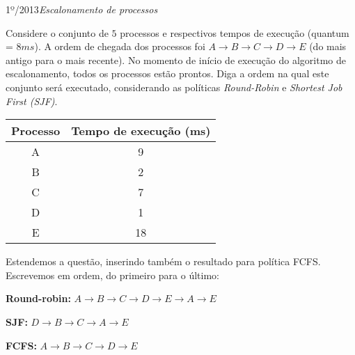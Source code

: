 \begin{exercicio}
  {1º/2013}{\textit{Escalonamento de processos}}
  {Considere o conjunto de $5$ processos e respectivos tempos de execução (quantum = $8 ms$). A ordem de chegada dos processos foi $A \rightarrow B \rightarrow C \rightarrow D \rightarrow E$ (do mais antigo para o mais recente). No momento de início de execução do algoritmo de escalonamento, todos os processos estão prontos. Diga a ordem na qual este conjunto será executado, considerando as políticas \textit{Round-Robin} e \textit{Shortest Job First (SJF)}.
  \begin{table}[!H]
    \centering
    \begin{tabular}{cc}
      \hline \hline
      \textbf{Processo} & \textbf{Tempo de execução (ms)} \\ \hline
      A                 & 9                               \\
      B                 & 2                              \\
      C                 & 7                               \\
      D                 & 1                               \\
      E                 & 18                              \\ \hline \hline
    \end{tabular}
  \end{table}
  } %

  Estendemos a questão, inserindo também o resultado para política FCFS. Escrevemos em ordem, do primeiro para o último:

  \textbf{Round-robin:} $A \rightarrow B \rightarrow C \rightarrow D \rightarrow E \rightarrow A \rightarrow E$

  \textbf{SJF:} $D \rightarrow B \rightarrow C \rightarrow A \rightarrow E$

  \textbf{FCFS:} $A \rightarrow B \rightarrow C \rightarrow D \rightarrow E$
\end{exercicio}

